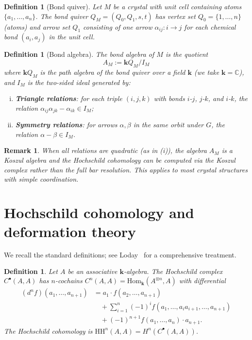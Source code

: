 \documentclass[12pt,a4paper]{article}
\newtheorem{definition}[theorem]{Definition}
\newtheorem{remark}[theorem]{Remark}
\newcommand{\HH}{\mathrm{HH}}
\newcommand{\Hom}{\mathrm{Hom}}
\newcommand{\kk}{\mathbf{k}}
\newcommand{\CC}{\mathbb{C}}
\begin{document}
\begin{definition}[Bond quiver]
\label{def:bond-quiver}
Let $M$ be a crystal with unit cell containing atoms
$\{a_1, \ldots, a_n\}$. The \emph{bond quiver} $Q_M = (Q_0, Q_1, s, t)$
has vertex set $Q_0 = \{1, \ldots, n\}$ (atoms) and arrow set
$Q_1$ consisting of one arrow $\alpha_{ij}: i \to j$ for each
chemical bond $(a_i, a_j)$ in the unit cell.
\end{definition}

\begin{definition}[Bond algebra]
\label{def:bond-algebra}
The \emph{bond algebra} of $M$ is the quotient
\[
  A_M := \kk Q_M / I_M
\]
where $\kk Q_M$ is the path algebra of the bond quiver over a field
$\kk$ (we take $\kk = \CC$), and $I_M$ is the two-sided ideal
generated by:
\begin{enumerate}[(i)]
  \item \textbf{Triangle relations}: for each triple $(i,j,k)$ with
    bonds $i$-$j$, $j$-$k$, and $i$-$k$, the relation
    $\alpha_{ij}\alpha_{jk} - \alpha_{ik} \in I_M$;
  \item \textbf{Symmetry relations}: for arrows $\alpha, \beta$ in
    the same orbit under $G$, the relation $\alpha - \beta \in I_M$.
\end{enumerate}
\end{definition}

\begin{remark}
When all relations are quadratic (as in (i)), the algebra $A_M$ is
a \emph{Koszul algebra} and the Hochschild cohomology can be computed
via the Koszul complex rather than the full bar resolution. This
applies to most crystal structures with simple coordination.
\end{remark}

\section{Hochschild cohomology and deformation theory}
\label{sec:hochschild}

We recall the standard definitions; see Loday~\cite{loday1998} for
a comprehensive treatment.

\begin{definition}
Let $A$ be an associative $\kk$-algebra. The \emph{Hochschild complex}
$C^\bullet(A, A)$ has $n$-cochains
$C^n(A, A) = \Hom_\kk(A^{\otimes n}, A)$ with differential
\begin{align*}
  (d^n f)(a_1, \ldots, a_{n+1}) &= a_1 \cdot f(a_2, \ldots, a_{n+1}) \\
  &\quad + \sum_{i=1}^n (-1)^i f(a_1, \ldots, a_i a_{i+1}, \ldots, a_{n+1}) \\
  &\quad + (-1)^{n+1} f(a_1, \ldots, a_n) \cdot a_{n+1}.
\end{align*}
The \emph{Hochschild cohomology} is $\HH^n(A, A) = H^n(C^\bullet(A,A))$.
\end{definition}
\end{document}
